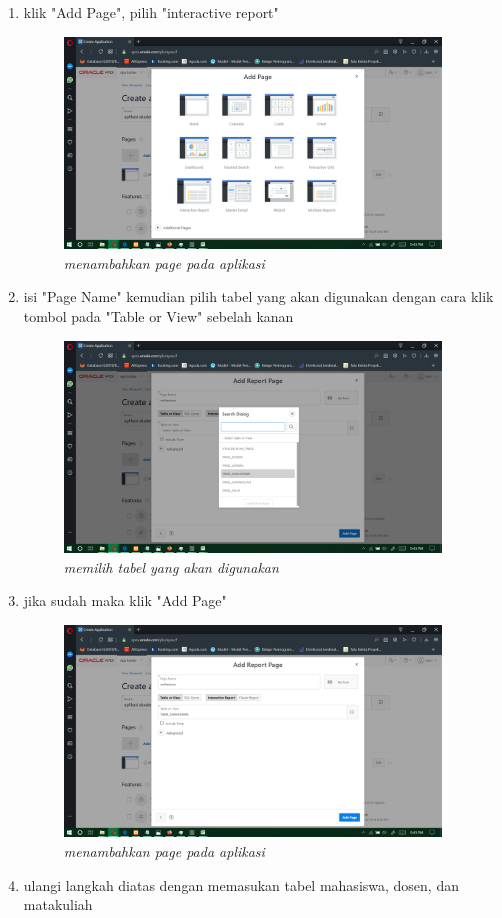 \documentclass[12pt]{ociamthesis}  %
\begin{document}
\begin{enumerate}
	\item klik "Add Page", pilih "interactive report"
	\begin{figure}[H]
    \centering
	\includegraphics[width=10cm]{figures/add page/Screenshot (236).png} 
    \caption{\textit{menambahkan page pada aplikasi}}
    \label{foto21}
 	\end{figure}
	\item isi "Page Name" kemudian pilih tabel yang akan digunakan dengan cara klik tombol pada "Table or View" sebelah kanan
	\begin{figure}[H]
    \centering
    \includegraphics[width=10cm]{figures/add page/Screenshot (238).png}
    \caption{\textit{memilih tabel yang akan digunakan}}
    \label{foto21}
 	\end{figure}
	\item jika sudah maka klik "Add Page"
	\begin{figure}[H]
    \centering
	\includegraphics[width=10cm]{figures/add page/Screenshot (239).png} 
    \caption{\textit{menambahkan page pada aplikasi}}
    \label{foto21}
 	\end{figure}
	\item ulangi langkah diatas dengan memasukan tabel mahasiswa, dosen, dan matakuliah
\end{enumerate}
\end{document}
